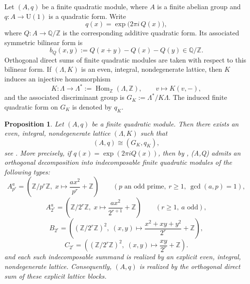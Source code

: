 \documentclass[12pt]{amsart}
\numberwithin{equation}{section}
\newtheorem{prop}[theorem]{Proposition}
\begin{document}
Let $(A,q)$ be a finite quadratic module, where $A$ is a finite abelian group and
$q \colon A \to \mathrm{U}(1)$ is a quadratic form. Write
\[
q(x)=\exp\!\bigl(2\pi i\,Q(x)\bigr),
\]
where $Q \colon A \to \mathbb{Q}/\mathbb{Z}$ is the corresponding additive quadratic form. Its associated symmetric bilinear form is
\[
b_Q(x,y):=Q(x+y)-Q(x)-Q(y)\in \mathbb{Q}/\mathbb{Z}.
\]
Orthogonal direct sums of finite quadratic modules are taken with respect to this bilinear
form. If $(\Lambda,K)$ is an even, integral, nondegenerate lattice, then $K$ induces an injective
homomorphism
\[
K \colon \Lambda \longrightarrow \Lambda^*:=\operatorname{Hom}_{\mathbb{Z}}(\Lambda,\mathbb{Z}),
\qquad
v\longmapsto K(v,-),
\]
and the associated discriminant group is $G_K:=\Lambda^*/K\Lambda.$ The induced finite quadratic form on $G_K$ is denoted by $q_K$.

\begin{prop}
\label{prop:constructive-realization}
Let $(A,q)$ be a finite quadratic module. Then there exists an even, integral, nondegenerate lattice $(\Lambda,K)$ such that
\[
(A,q)\cong (G_K,q_K),
\]
see \cite[Theorem 6]{Wall1963}. More precisely, if $q(x)=\exp(2\pi i Q(x))$, then by \cite[Definition 3.11 and Theorem 3.19]{Zhu2021},
(A,Q) admits an orthogonal decomposition into indecomposable finite quadratic modules
of the following types:
\[A^a_{p^r} =
\left(
\mathbb Z/p^r\mathbb Z,\;
x \mapsto \frac{ax^2}{p^r} + \mathbb Z
\right)
\qquad
(p \text{ an odd prime},\ r \ge 1,\ \gcd(a,p)=1),
\]
\[
A^a_{2^r} =
\left(
\mathbb Z/2^r\mathbb Z,\;
x \mapsto \frac{ax^2}{2^{r+1}} + \mathbb Z
\right)
\qquad
(r \ge 1,\ a \text{ odd}),
\]
\[
B_{2^r} =
\left(
(\mathbb Z/2^r\mathbb Z)^2,\;
(x,y)\mapsto \frac{x^2+xy+y^2}{2^r} + \mathbb Z
\right),
\]
\[
C_{2^r} =
\left(
(\mathbb Z/2^r\mathbb Z)^2,\;
(x,y)\mapsto \frac{xy}{2^r} + \mathbb Z
\right).
\]
and each such indecomposable summand is realized by an explicit even, integral,
nondegenerate lattice. Consequently, $(A,q)$ is realized by the orthogonal direct sum
of these explicit lattice blocks.
\end{prop}
\end{document}
